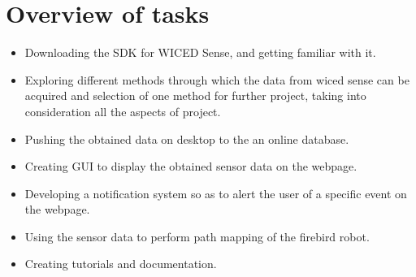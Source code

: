 \documentclass[a4paper,12pt,oneside]{book}
\begin{document}
\newpage
\section{Overview of tasks}
\begin{itemize}
  \item Downloading the SDK for WICED Sense, and getting familiar with it.
  \item  Exploring different methods through which the data from wiced sense can be acquired and selection of one method for further project, taking into consideration all the aspects of project.
  \item Pushing the obtained data on desktop to the an online database.
  \item Creating GUI to display the obtained sensor data on the webpage.
  \item Developing a notification system so as to alert the user of a specific event on the webpage.
  \item Using the sensor data to perform path mapping of the firebird robot.
  \item Creating tutorials and documentation.
\end{itemize}


\tableofcontents
\newpage


\end{document}
